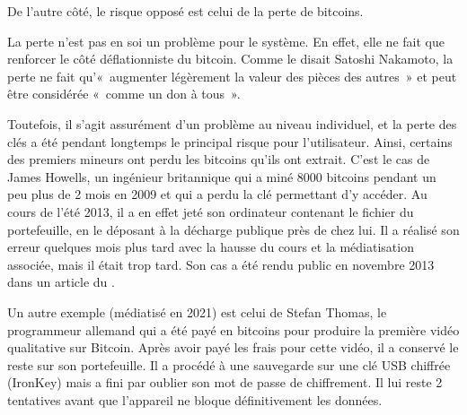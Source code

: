 De l'autre côté, le risque opposé est celui de la perte de bitcoins. 

La perte n'est pas en soi un problème pour le système. En effet, elle ne fait que renforcer le côté déflationniste du bitcoin. Comme le disait Satoshi Nakamoto, la perte ne fait qu'«~augmenter légèrement la valeur des pièces des autres~» et peut être considérée «~comme un don à tous~».

Toutefois, il s'agit assurément d'un problème au niveau individuel, et la perte des clés a été pendant longtemps le principal risque pour l'utilisateur. Ainsi, certains des premiers mineurs ont perdu les bitcoins qu'ils ont extrait. C'est le cas de James Howells, un ingénieur britannique qui a miné 8000 bitcoins pendant un peu plus de 2 mois en 2009 et qui a perdu la clé permettant d'y accéder. Au cours de l’été 2013, il a en effet jeté son ordinateur contenant le fichier du portefeuille, en le déposant à la décharge publique près de chez lui. Il a réalisé son erreur quelques mois plus tard avec la hausse du cours et la médiatisation associée, mais il était trop tard. Son cas a été rendu public en novembre 2013 dans un article du .

Un autre exemple (médiatisé en 2021) est celui de Stefan Thomas, le programmeur allemand qui a été payé en bitcoins pour produire la première vidéo qualitative sur Bitcoin. Après avoir payé les frais pour cette vidéo, il a conservé le reste sur son portefeuille. Il a procédé à une sauvegarde sur une clé USB chiffrée (IronKey) mais a fini par oublier son mot de passe de chiffrement. Il lui reste 2 tentatives avant que l'appareil ne bloque définitivement les données.

